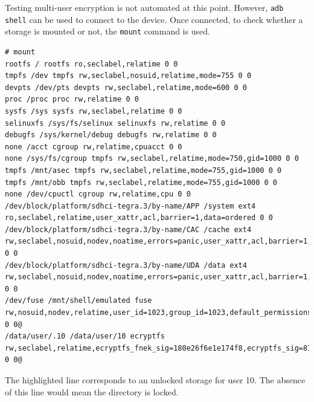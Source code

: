 Testing multi-user encryption is not automated at this point. However, \texttt{adb shell} can be used to connect to the device. Once connected, to check whether a storage is mounted or not, the \texttt{mount} command is used.

\begin{lstlisting}[numbers=none, style=custom]
# mount
rootfs / rootfs ro,seclabel,relatime 0 0
tmpfs /dev tmpfs rw,seclabel,nosuid,relatime,mode=755 0 0
devpts /dev/pts devpts rw,seclabel,relatime,mode=600 0 0
proc /proc proc rw,relatime 0 0
sysfs /sys sysfs rw,seclabel,relatime 0 0
selinuxfs /sys/fs/selinux selinuxfs rw,relatime 0 0
debugfs /sys/kernel/debug debugfs rw,relatime 0 0
none /acct cgroup rw,relatime,cpuacct 0 0
none /sys/fs/cgroup tmpfs rw,seclabel,relatime,mode=750,gid=1000 0 0
tmpfs /mnt/asec tmpfs rw,seclabel,relatime,mode=755,gid=1000 0 0
tmpfs /mnt/obb tmpfs rw,seclabel,relatime,mode=755,gid=1000 0 0
none /dev/cpuctl cgroup rw,relatime,cpu 0 0
/dev/block/platform/sdhci-tegra.3/by-name/APP /system ext4 ro,seclabel,relatime,user_xattr,acl,barrier=1,data=ordered 0 0
/dev/block/platform/sdhci-tegra.3/by-name/CAC /cache ext4 rw,seclabel,nosuid,nodev,noatime,errors=panic,user_xattr,acl,barrier=1,nomblk_io_submit,data=ordered 0 0
/dev/block/platform/sdhci-tegra.3/by-name/UDA /data ext4 rw,seclabel,nosuid,nodev,noatime,errors=panic,user_xattr,acl,barrier=1,nomblk_io_submit,data=ordered 0 0
/dev/fuse /mnt/shell/emulated fuse rw,nosuid,nodev,relatime,user_id=1023,group_id=1023,default_permissions,allow_other 0 0@
/data/user/.10 /data/user/10 ecryptfs rw,seclabel,relatime,ecryptfs_fnek_sig=180e26f6e1e174f8,ecryptfs_sig=81661eb0fc6a797b,ecryptfs_cipher=aes,ecryptfs_key_bytes=32 0 0@
\end{lstlisting}

The highlighted line corresponds to an unlocked storage for user 10. The absence of this line would mean the directory is locked.
